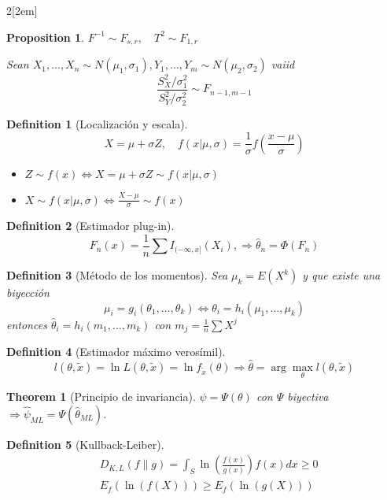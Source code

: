 \documentclass[leqno]{article}
\newtheorem*{theorem}{Theorem}
\newtheorem*{proposition}{Proposition}
\newtheorem*{definition}{Definition}
\begin{document}
\begin{multicols}{2}[\columnsep2em]
\begin{proposition}
$ F^{-1} \sim F_{s, r}, \quad T^2 \sim F_{1, r} $

Sean $ X_1, ..., X_n \sim N(\mu_1, \sigma_1), Y_1, ..., Y_m \sim N(\mu_2, \sigma_2)$ vaiid
\[ \frac{S_X^2/\sigma_1^2}{S_Y^2/\sigma_2^2} \sim F_{n-1, m-1}\]
\end{proposition}


\begin{definition}[Localización y escala]
\[
  X = \mu + \sigma Z, \quad f(x|\mu, \sigma )= \frac{1}{\sigma }f\left( \frac{x-\mu}{\sigma } \right) 
\]
\begin{itemize}[topsep=-6pt, itemsep=0pt]
  \item $Z \sim f(x) \iff X = \mu + \sigma Z \sim f(x|\mu, \sigma )$
  \item $X\sim f(x|\mu, \sigma ) \iff \frac{X-\mu}{\sigma } \sim  f(x)$
\end{itemize}
\end{definition}

\begin{definition}[Estimador plug-in]
 \[
   F_n(x) = \frac{1}{n} \sum I_{(-\infty, x]}(X_i), \Rightarrow \hat{\theta }_n = \Phi (F_n)
\] 
\end{definition}

\begin{definition}[Método de los momentos]
Sea $\mu_k = E(X^k)$ y que existe una biyección
\[
\mu_i = g_i(\theta_1, \ldots, \theta _k) \iff \theta _i = h_i(\mu_1, \ldots, \mu _k)
\] 
entonces $\hat{\theta }_i = h_i(m_1,\ldots, m_k)$ con $m_j = \frac{1}{n}\sum X^j$
\end{definition}

\begin{definition}[Estimador máximo verosímil]
\[
l(\theta , \tilde{x})= \ln L(\theta , \tilde{x}) = \ln f_{\tilde{x}}(\theta ) \Rightarrow \hat{\theta } = \arg \max_{\theta } l(\theta , \tilde{x})
\] 
\end{definition}

\begin{theorem}[Principio de invariancia]
    $\psi = \Psi(\theta)$ con $\Psi$ biyectiva $\Rightarrow \hat\psi_{ML} = \Psi(\hat\theta_{ML})$.
\end{theorem}

\begin{definition}[Kullback-Leiber]
  \begin{align*}
  &D_{K, L}(f \| g) = \int_S \ln\left( \frac{f(x)}{g(x)}\right)f(x)dx \ge 0\\
  &E_f(\ln(f(X)))\ge E_f(\ln(g(X)))
  \end{align*}
\end{definition}


\end{multicols}
\end{document}
